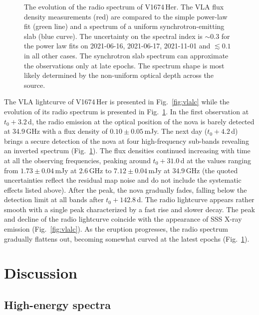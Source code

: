 \documentclass[a4paper,fleqn,usenatbib]{mnras}
\newcommand{\nova}{V1674\,Her}
\begin{document}
\begin{figure}
    \caption{The evolution of the radio spectrum of \nova{}. The VLA flux
density measurements (red) are compared to the simple power-law fit (green
line) and a spectrum of a uniform synchrotron-emitting slab (blue curve). 
The uncertainty on the spectral index 
is $\sim0.3$ for the power law fits on 2021-06-16, 2021-06-17, 2021-11-01 and $\lesssim 0.1$ in all other cases. 
The synchrotron slab spectrum can approximate the observations only at late epochs. 
The spectrum shape is most likely determined by the non-uniform optical depth across the source.}
    \label{fig:vlaspec}
\end{figure}


The VLA lightcurve of \nova{} is presented in Fig.~\ref{fig:vlalc} 
while the evolution of its radio spectrum is presented in Fig.~\ref{fig:vlaspec}. 
In the first observation at $t_0+3.2$\,d, the radio emission at the optical position 
of the nova is barely detected at 34.9\,GHz with a flux density of $0.10 \pm 0.05$\,mJy.
The next day ($t_0+4.2$\,d) brings a secure detection of the nova at four
high-frequency sub-bands revealing an inverted spectrum (Fig.~\ref{fig:vlaspec}). 
The flux densities continued increasing with time at all the observing frequencies,  peaking
around $t_0+31.0$\,d at the values ranging from $1.73 \pm 0.04$\,mJy
at 2.6\,GHz to $7.12 \pm 0.04$\,mJy at 34.9\,GHz (the quoted uncertainties
reflect the residual map noise and do not include the systematic effects
listed above). After the peak, the nova gradually fades, falling below the
detection limit at all bands after $t_0 + 142.8$\,d. The radio lightcurve appears
rather smooth with a single peak characterized by a fast rise and slower decay.
The peak and decline of the radio lightcurve coincide with the appearance of
SSS X-ray emission (Fig.~\ref{fig:vlalc}). 
As the eruption progresses, the radio spectrum gradually
flattens out, becoming somewhat curved at the latest epochs (Fig.~\ref{fig:vlaspec}).




\section{Discussion}
\label{sec:discussion}

\subsection{High-energy spectra}
\label{sec:specshape}
\end{document}
